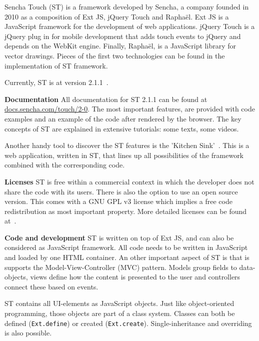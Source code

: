 \documentclass[a4paper]{artikel3}
\newcommand{\code}[1]{\texttt{#1}}
\renewcommand{\url}[1]{\href{http://#1}{#1}}
\renewcommand{\paragraph}[1]{{\bf #1} }
\begin{document}
Sencha Touch	 (ST) is a framework developed by Sencha,  a company founded in 2010 as a composition of Ext JS, jQuery Touch and Raphaël.  Ext JS is a JavaScript framework for the development of web applications.  jQuery Touch is a jQuery plug in for mobile development that adds touch events to jQuery and depends on the WebKit engine.  Finally,  Raphaël, is a JavaScript library for vector drawings.  Pieces of the first two technologies can be found in the implementation of ST framework.    

Currently,  ST is at version 2.1.1~\cite{Inc.}.

\paragraph{Documentation}
All documentation for ST 2.1.1 can be found at \url{docs.sencha.com/touch/2-0}.  The most important features,  are provided with code examples and an example of the code after rendered by the browser.  The key concepts of ST are explained in extensive tutorials:  some texts, some videos.  

Another handy tool to discover the ST features is the 'Kitchen Sink'~\cite{Inc.2013}.  This is a web application,  written in ST,  that lines up all possibilities of the framework combined with the corresponding code.

\paragraph{Licenses}
ST is free within a commercial context in which the developer does not share the code with its users.  There is also the option to use an open source version.  This comes with a GNU GPL v3 license which implies a free code redistribution as most important property.
More detailed licenses can be found at~\cite{SenchaInc.}.
  
\paragraph{Code and development}
ST is written on top of Ext JS,  and can also be considered as JavaScript framework.  All code needs to be written in JavaScript and loaded by one HTML container.  An other important aspect of ST is that is supports the Model-View-Controller (MVC) pattern.  Models group fields to data-objects,  views define how the content is presented to the user and controllers connect these based on events.

ST contains all UI-elements as JavaScript objects.  Just like object-oriented programming,  those objects are part of a class system.  Classes can both be defined (\code{Ext.define}) or created (\code{Ext.create}).  Single-inheritance and overriding is also possible.    
\end{document}
